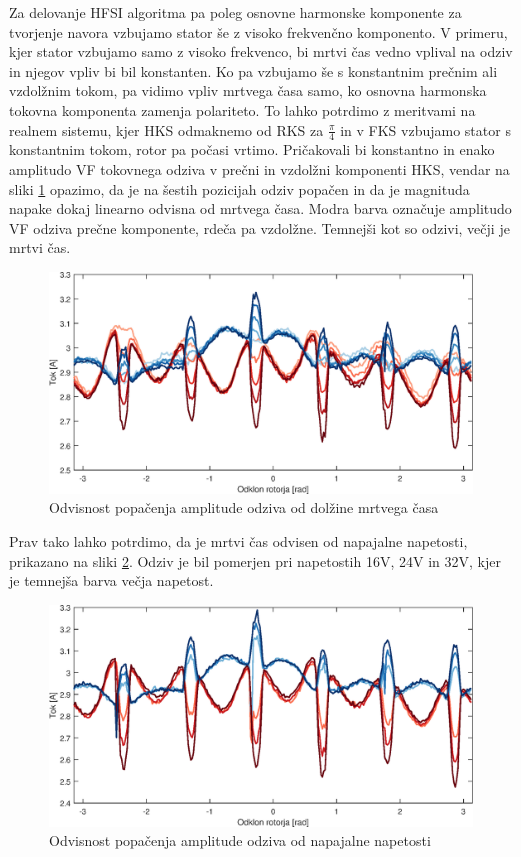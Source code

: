 \documentclass[a4paper,twoside,openright,12pt,slovene]{book}
\begin{document}
Za delovanje HFSI algoritma pa poleg osnovne harmonske komponente za tvorjenje navora vzbujamo stator še z visoko frekvenčno komponento. V primeru, kjer stator vzbujamo samo z visoko frekvenco, bi
mrtvi čas vedno vplival na odziv in njegov vpliv bi bil konstanten. Ko pa vzbujamo še s konstantnim prečnim ali vzdolžnim tokom, pa vidimo vpliv mrtvega časa samo, ko osnovna harmonska tokovna komponenta
zamenja polariteto. To lahko potrdimo z meritvami na realnem sistemu, kjer HKS odmaknemo od RKS za $\frac{\pi}{4}$ in v FKS vzbujamo stator s konstantnim tokom, rotor pa počasi vrtimo. Pričakovali bi
konstantno in enako amplitudo VF tokovnega odziva v prečni in vzdolžni komponenti HKS, vendar na sliki \ref{mrtviCas} opazimo, da je na šestih pozicijah odziv popačen in da je magnituda napake dokaj linearno odvisna
od mrtvega časa. Modra barva označuje amplitudo VF odziva prečne komponente, rdeča pa vzdolžne. Temnejši kot so odzivi, večji je mrtvi čas. 

\begin{figure}[!htbp]
    \centering
    \includegraphics[width=1\columnwidth]{Slike/mrtviCas.eps}
    \caption{\label{mrtviCas} Odvisnost popačenja amplitude odziva od dolžine mrtvega časa}
\end{figure}

Prav tako lahko potrdimo, da je mrtvi čas odvisen od napajalne napetosti, prikazano na sliki \ref{mrtviCasNapetost}. Odziv je bil pomerjen pri napetostih 16V, 24V in 32V, kjer je temnejša barva večja
napetost.


\begin{figure}[!htbp]
    \centering
    \includegraphics[width=1\columnwidth]{Slike/mrtviCasNapetost.eps}
    \caption{\label{mrtviCasNapetost} Odvisnost popačenja amplitude odziva od napajalne napetosti }
\end{figure}
\end{document}
